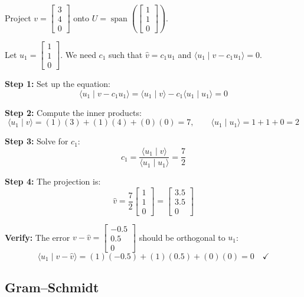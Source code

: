 \documentclass[11pt]{article}
\theoremstyle{definition}
\theoremstyle{plain}
\theoremstyle{remark}
\DeclareMathOperator{\spn}{span}
\begin{document}
\begin{workedexample}[title=\textbf{Worked Example: Projecting a 3D vector onto a line}]
Project $v = \begin{bmatrix}3\\4\\0\end{bmatrix}$ onto $U = \spn\!\left(\begin{bmatrix}1\\1\\0\end{bmatrix}\right)$.

Let $u_1 = \begin{bmatrix}1\\1\\0\end{bmatrix}$. We need $c_1$ such that $\hat{v} = c_1 u_1$ and $\langle u_1 \mid v - c_1 u_1 \rangle = 0$.

\textbf{Step 1:} Set up the equation:
\[
\langle u_1 \mid v - c_1 u_1 \rangle = \langle u_1 \mid v \rangle - c_1 \langle u_1 \mid u_1 \rangle = 0
\]

\textbf{Step 2:} Compute the inner products:
\[
\langle u_1 \mid v \rangle = (1)(3) + (1)(4) + (0)(0) = 7, \qquad \langle u_1 \mid u_1 \rangle = 1 + 1 + 0 = 2
\]

\textbf{Step 3:} Solve for $c_1$:
\[
c_1 = \frac{\langle u_1 \mid v \rangle}{\langle u_1 \mid u_1 \rangle} = \frac{7}{2}
\]

\textbf{Step 4:} The projection is:
\[
\hat{v} = \frac{7}{2}\begin{bmatrix}1\\1\\0\end{bmatrix} = \begin{bmatrix}3.5\\3.5\\0\end{bmatrix}
\]

\textbf{Verify:} The error $v - \hat{v} = \begin{bmatrix}-0.5\\0.5\\0\end{bmatrix}$ should be orthogonal to $u_1$:
\[
\langle u_1 \mid v - \hat{v} \rangle = (1)(-0.5) + (1)(0.5) + (0)(0) = 0 \quad \checkmark
\]
\end{workedexample}

\subsection{Gram--Schmidt}
\end{document}
